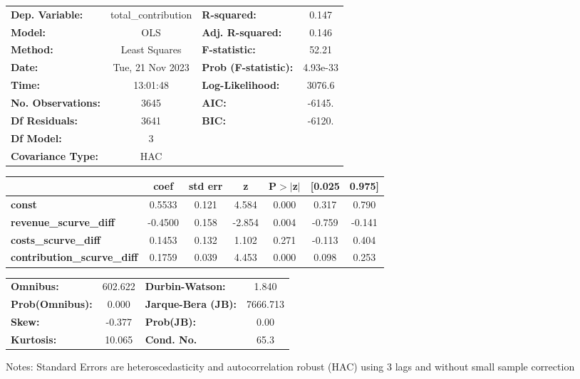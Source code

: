 \begin{center}
\begin{tabular}{lclc}
\toprule
\textbf{Dep. Variable:}             & total\_contribution & \textbf{  R-squared:         } &     0.147   \\
\textbf{Model:}                     &         OLS         & \textbf{  Adj. R-squared:    } &     0.146   \\
\textbf{Method:}                    &    Least Squares    & \textbf{  F-statistic:       } &     52.21   \\
\textbf{Date:}                      &   Tue, 21 Nov 2023  & \textbf{  Prob (F-statistic):} &  4.93e-33   \\
\textbf{Time:}                      &       13:01:48      & \textbf{  Log-Likelihood:    } &    3076.6   \\
\textbf{No. Observations:}          &          3645       & \textbf{  AIC:               } &    -6145.   \\
\textbf{Df Residuals:}              &          3641       & \textbf{  BIC:               } &    -6120.   \\
\textbf{Df Model:}                  &             3       & \textbf{                     } &             \\
\textbf{Covariance Type:}           &         HAC         & \textbf{                     } &             \\
\bottomrule
\end{tabular}
\begin{tabular}{lcccccc}
                                    & \textbf{coef} & \textbf{std err} & \textbf{z} & \textbf{P$> |$z$|$} & \textbf{[0.025} & \textbf{0.975]}  \\
\midrule
\textbf{const}                      &       0.5533  &        0.121     &     4.584  &         0.000        &        0.317    &        0.790     \\
\textbf{revenue\_scurve\_diff}      &      -0.4500  &        0.158     &    -2.854  &         0.004        &       -0.759    &       -0.141     \\
\textbf{costs\_scurve\_diff}        &       0.1453  &        0.132     &     1.102  &         0.271        &       -0.113    &        0.404     \\
\textbf{contribution\_scurve\_diff} &       0.1759  &        0.039     &     4.453  &         0.000        &        0.098    &        0.253     \\
\bottomrule
\end{tabular}
\begin{tabular}{lclc}
\textbf{Omnibus:}       & 602.622 & \textbf{  Durbin-Watson:     } &    1.840  \\
\textbf{Prob(Omnibus):} &   0.000 & \textbf{  Jarque-Bera (JB):  } & 7666.713  \\
\textbf{Skew:}          &  -0.377 & \textbf{  Prob(JB):          } &     0.00  \\
\textbf{Kurtosis:}      &  10.065 & \textbf{  Cond. No.          } &     65.3  \\
\bottomrule
\end{tabular}
\end{center}

Notes: \newline
 [1] Standard Errors are heteroscedasticity and autocorrelation robust (HAC) using 3 lags and without small sample correction